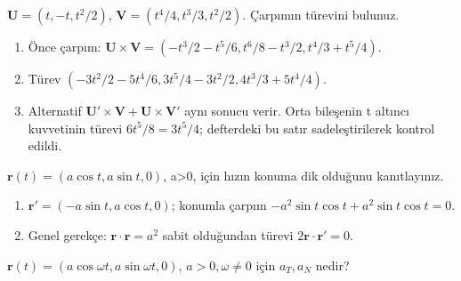 \begin{tcolorbox}[title={Örnek 3.21 | Vektörel çarpımın türevini iki yoldan almak},colframe=accent]\(\mathbf U=(t,-t,t^2/2)\), \(\mathbf V=(t^4/4,t^3/3,t^2/2)\). Çarpımın türevini bulunuz.
\par{}\end{tcolorbox}
\begin{tcolorbox}[title={Adım adım çözüm},colback=green!3!white,colframe=green]\begin{enumerate}
\item Önce çarpım: \(\mathbf U\times\mathbf V=(-t^3/2-t^5/6,t^6/8-t^3/2,t^4/3+t^5/4)\).
\item Türev \((-3t^2/2-5t^4/6,3t^5/4-3t^2/2,4t^3/3+5t^4/4)\).
\item Alternatif \(\mathbf U\prime\times\mathbf V+\mathbf U\times\mathbf V\prime\) aynı sonucu verir. Orta bileşenin t altıncı kuvvetinin türevi \(6t^5/8=3t^5/4\); defterdeki bu satır sadeleştirilerek kontrol edildi.
\end{enumerate}\end{tcolorbox}
\begin{tcolorbox}[title={Örnek 3.22 | Sabit normun türevi},colframe=accent]\(\mathbf r(t)=(a\cos t,a\sin t,0)\), a>0, için hızın konuma dik olduğunu kanıtlayınız.
\par{}\end{tcolorbox}
\begin{tcolorbox}[title={Adım adım çözüm},colback=green!3!white,colframe=green]\begin{enumerate}
\item \(\mathbf r\prime=(-a\sin t,a\cos t,0)\); konumla çarpım \(-a^2\sin t\cos t+a^2\sin t\cos t=0\).
\item Genel gerekçe: \(\mathbf r\cdot\mathbf r=a^2\) sabit olduğundan türevi \(2\mathbf r\cdot\mathbf r\prime=0\).
\end{enumerate}\end{tcolorbox}
\begin{tcolorbox}[title={Örnek 3.23 | Dairesel harekette ivme},colframe=accent]\(\mathbf r(t)=(a\cos\omega t,a\sin\omega t,0)\), \(a>0,\omega\ne0\) için \(a_T,a_N\) nedir?
\par\vspace{1mm}{\scriptsize\sffamily Pekiştirme}\end{tcolorbox}
